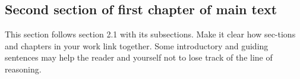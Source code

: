 \subsection{Second section of first chapter of main text}
This section follows section 2.1 with its subsections. Make it clear how sec-tions and chapters in your work link together. Some introductory and guiding sentences may help the reader and yourself not to lose track of the line of reasoning.

\newpage